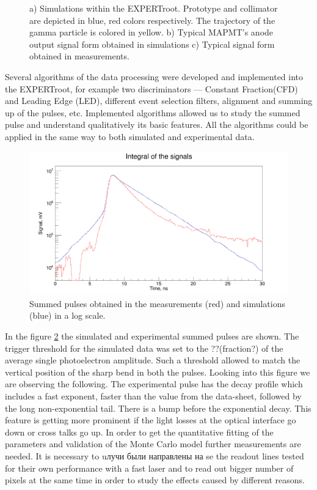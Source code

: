 \documentclass{webofc}
\newcommand{\er}{\textmd{EXPERTroot}}
\begin{document}
\begin{figure}[h]
\begin{minipage}[h]{0.35\linewidth}
	\end{minipage}
	\caption{a) Simulations within the \er. Prototype and collimator are depicted in blue, red colors respectively. The trajectory of the gamma particle is colored in yellow. b) Typical MAPMT's anode output signal form obtained in simulations c) Typical signal form obtained in measurements.}
	\label{ris:sim}
\end{figure}

Several algorithms of the data processing were developed and implemented into the \er, for example two discriminators --- Constant Fraction(CFD) and Leading Edge (LED), different event selection filters, alignment and summing up of the pulses, etc. Implemented algorithms allowed us to study the summed pulse and understand qualitatively its basic features. All the algorithms could be applied in the same way to both simulated and experimental data.

\begin{figure}
	\includegraphics[width=\linewidth]{sum.png}
	\caption{Summed pulses obtained in the measurements (red) and simulations (blue) in a log scale.}\label{ris:sum}
\end{figure}



In the figure \ref{ris:sum} the simulated and experimental summed pulses are shown. The trigger threshold for the simulated data was set to the ??(fraction?) of the average single photoelectron amplitude. Such a threshold allowed to match the vertical position of the sharp bend in both the pulses. Looking into this figure we are observing the following. The experimental pulse has  the decay profile which includes a fast exponent, faster than the value from the data-sheet, followed by the long non-exponential tail. There is a bump before the exponential decay. This feature is getting more prominent if the light losses at the optical interface go down or cross talks go up.  In order to get the quantitative fitting of the parameters and validation of the Monte Carlo model further measurements are needed. It is necessary to uлучи были направлены на se the readout lines tested for their own performance with a fast laser and to read out bigger number of pixels at the same time in order to study the effects caused by different reasons.
\end{document}
